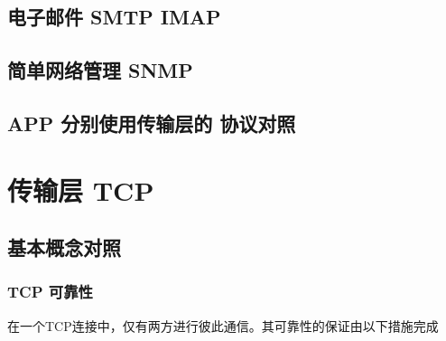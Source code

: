 \documentclass[UTF8,a4paper,8pt]{ctexbook}
\begin{document}
		\subsection{电子邮件 SMTP IMAP}	
		
		\subsection{简单网络管理 SNMP}
		
		\subsection{APP 分别使用传输层的 协议对照}
			\begin{figure}[h]
				\centering
			\end{figure}
		
	\section{传输层 TCP}		
		\subsection{基本概念对照} 
			\subsubsection{TCP 可靠性}
				在一个TCP连接中，仅有两方进行彼此通信。其可靠性的保证由以下措施完成
				
\end{document}
